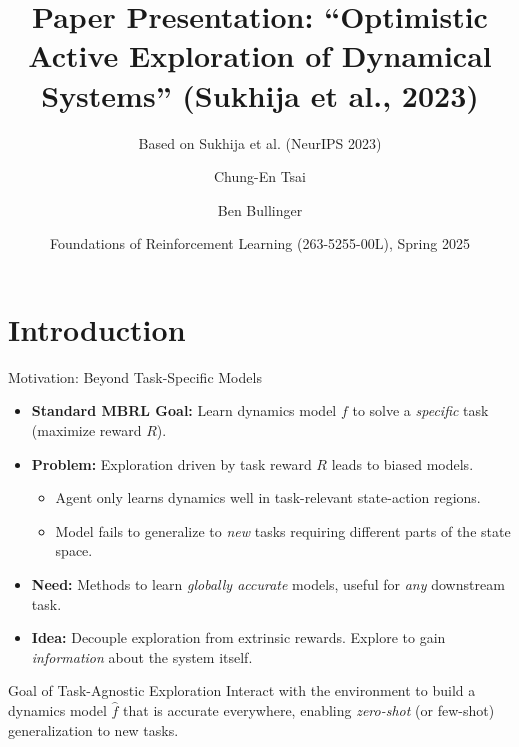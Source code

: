 \documentclass[11pt,aspectratio=169]{beamer}
\title{Paper Presentation: ``Optimistic Active Exploration of Dynamical Systems'' (Sukhija et al., 2023)}
\subtitle{Based on Sukhija et al. (NeurIPS 2023)} %
\author{Chung-En Tsai \and Ben Bullinger} %
\institute{ETH Zürich \\ Department of Computer Science}
\date[]{Foundations of Reinforcement Learning (263-5255-00L), Spring 2025} %
\begin{document}
\def\titlefigure{elements/title-page-image}  %
\setlength{\titleboxwidth}{0.85\textwidth} %
\titleframe %

\tocframe %

\section{Introduction}

\begin{frame}{Motivation: Beyond Task-Specific Models}
    \begin{itemize}
        \item \textbf{Standard MBRL Goal:} Learn dynamics model $f$ to solve a \textit{specific} task (maximize reward $R$).
        \item \textbf{Problem:} Exploration driven by task reward $R$ leads to biased models.
        \begin{itemize}
            \item Agent only learns dynamics well in task-relevant state-action regions.
            \item Model fails to generalize to \textit{new} tasks requiring different parts of the state space.
            \end{itemize}
        \item \textbf{Need:} Methods to learn \textit{globally accurate} models, useful for \textit{any} downstream task.
        \pause
        \item \textbf{Idea:} Decouple exploration from extrinsic rewards. Explore to gain \textit{information} about the system itself.
    \end{itemize}
    \vspace{1em}
    \begin{alertblock}{Goal of Task-Agnostic Exploration}
        Interact with the environment to build a dynamics model $\hat{f}$ that is accurate everywhere, enabling \textit{zero-shot} (or few-shot) generalization to new tasks.
    \end{alertblock}
\end{frame}
\end{document}
